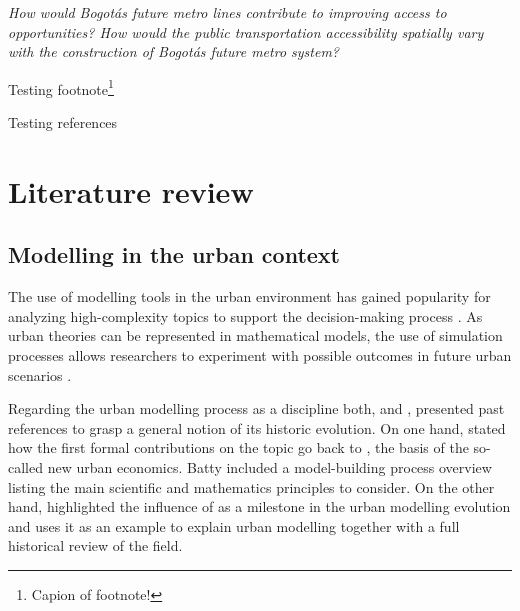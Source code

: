 \documentclass[12pt, a4paper]{report}
\begin{document}

\begin{center}
    \textit{How would Bogot\'{a}\textquotesingle s future metro lines contribute to improving access to opportunities? How would the public transportation accessibility spatially vary with the construction of Bogot\'{a}\textquotesingle s future metro system?}
\end{center}




Testing footnote\footnote{Capion of footnote!}

Testing references \citep{alcaldiamayordebogotad.c.EstacionesPrimeraLinea2022}


\chapter{Literature review} \label{Chap2}

\section{Modelling in the urban context}

The use of modelling tools in the urban environment has gained popularity for analyzing high-complexity topics to support the decision-making process \citep{houApproachBuildingOccupancy2020}. As urban theories can be represented in mathematical models, the use of simulation processes allows researchers to experiment with possible outcomes in future urban scenarios \citep{battyUrbanModeling2009a}.

Regarding the urban modelling process as a discipline both, \cite{battyUrbanModeling2009a} and \cite{wilsonFutureUrbanModelling2018}, presented past references to grasp a general notion of its historic evolution. On one hand, \cite{battyUrbanModeling2009a} stated how the first formal contributions on the topic go back to \cite{alonsoLocationLandUse1964}, the basis of the so-called new urban economics. Batty included a model-building process overview listing the main scientific and mathematics principles to consider. On the other hand, \cite{wilsonScienceCitiesRegions2012} highlighted the influence of \cite{lowryModelMetropolis1964} as a milestone in the urban modelling evolution and uses it as an example to explain urban modelling together with a full historical review of the field.
\end{document}
